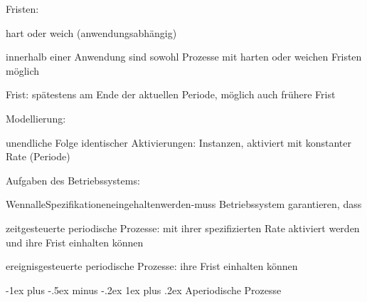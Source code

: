 \documentclass[a4paper]{article}
\makeatletter
\renewcommand{\subsubsection}{\@startsection{subsubsection}{3}{0mm}%
 {-1ex plus -.5ex minus -.2ex}%
 {1ex plus .2ex}%
 {\normalfont\small\bfseries}}
\makeatother
\begin{document}
\begin{multicols}{3}
    \begin{itemize*}
        \item
        Fristen:
        \begin{itemize*}
            \item hart oder weich (anwendungsabhängig) \begin{itemize*} \item innerhalb einer Anwendung sind sowohl Prozesse mit harten oder weichen Fristen möglich \item Frist: spätestens am Ende der aktuellen Periode, möglich auch frühere Frist \end{itemize*}
        \end{itemize*}
        \item
        Modellierung:
        \begin{itemize*}
            \item unendliche Folge identischer Aktivierungen: Instanzen, aktiviert mit konstanter Rate (Periode)
        \end{itemize*}
        \item
        Aufgaben des Betriebssystems:
        \begin{itemize*}
            \item WennalleSpezifikationeneingehaltenwerden-muss Betriebssystem garantieren, dass \begin{enumerate*} \item zeitgesteuerte periodische Prozesse: mit ihrer spezifizierten Rate aktiviert werden und ihre Frist einhalten können \item ereignisgesteuerte periodische Prozesse: ihre Frist einhalten können \end{enumerate*}
        \end{itemize*}
    \end{itemize*}


    \subsubsection{Aperiodische Prozesse}


\end{multicols}
\end{document}

